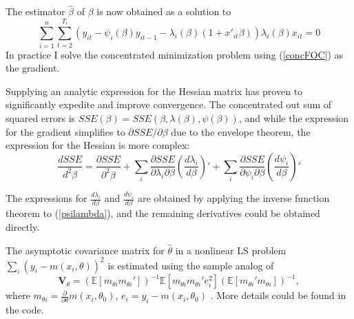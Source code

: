 \documentclass[
  12pt,
  pagebackref]{article}
\begin{document}
\noindent The estimator \(\hat \beta\) of \(\beta\) is now obtained as a
solution to \begin{equation}\label{concFOC}
\sum_{i=1}^n \sum_{t=2}^{T_i} (y_{it} - \psi_i(\beta) y_{it-1} - \lambda_i(\beta)(1+x'_{it}\beta))\lambda_i(\beta)x_{it} = 0
\end{equation} In practice I solve the concentrated minimization problem
using (\ref{concFOC}) as the gradient.

Supplying an analytic expression for the Hessian matrix has proven to
significantly expedite and improve convergence. The concentrated out sum
of squared errors is
\(SSE(\beta) = SSE(\beta, \lambda(\beta), \psi(\beta))\), and while the
expression for the gradient simplifies to
\(\partial SSE/\partial \beta\) due to the envelope theorem, the
expression for the Hessian is more complex:
\begin{equation}\label{hessianEq}
\frac{d SSE}{d^2\beta} = \frac{\partial SSE}{\partial^2 \beta} + 
\sum_i \frac{\partial SSE}{\partial\lambda_i \partial \beta} \left(\frac{d \lambda_i}{d \beta}\right)' + 
\sum_i \frac{\partial SSE}{\partial\psi_i \partial \beta} \left(\frac{d \psi_i}{d \beta}\right)'
\end{equation}

\noindent The expressions for \(\frac{d \lambda_i}{d \beta}\) and
\(\frac{d \psi_i}{d \beta}\) are obtained by applying the inverse
function theorem to (\ref{psilambda}), and the remaining derivatives
could be obtained directly.

The asymptotic covariance matrix for \(\hat \theta\) in a nonlinear LS
problem \(\sum_i (y_i - m(x_i, \theta))^2\) is estimated using the
sample analog of \begin{equation}
\mathbf V_\theta = \left(\mathbb{E}\left[m_{\theta i}m_{\theta i}'\right]\right)^{-1}
                \mathbb{E}\left[m_{\theta i}m_{\theta i}'e_i^2\right]
                \left(\mathbb{E}\left[m_{\theta i}'m_{\theta i}\right]\right)^{-1},
\end{equation} where
\(m_{\theta i} = \frac{\partial}{\partial \theta} m(x_i, \theta_0)\),
\(e_i = y_i - m(x_i, \theta_0)\) \citep[p.751]{Hansen20}. More details
could be found in the code.

\newpage

  
\end{document}
